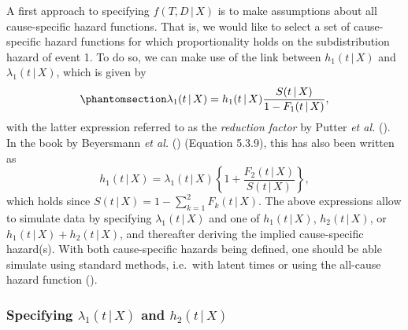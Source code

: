 \documentclass[
  letterpaper,
  DIV=11,
  numbers=noendperiod]{scrreprt}
\newcommand{\given}{\,|\,}
\begin{document}
A first approach to specifying \(f(T, D \given X)\) is to make
assumptions about all cause-specific hazard functions. That is, we would
like to select a set of cause-specific hazard functions for which
proportionality holds on the subdistribution hazard of event 1. To do
so, we can make use of the link between \(h_1(t \given X)\) and
\(\lambda_1(t \given X)\), which is given by
\begin{equation}\phantomsection\label{eq-reduc}{
\lambda_1(t \given X) = h_1(t \given X)\frac{S(t \given X)}{1 - F_1(t \given X)},
}\end{equation} with the latter expression referred to as the
\textit{reduction factor} by Putter \emph{et al.}
(). In the
book by Beyersmann \emph{et al.}
() (Equation
5.3.9), this has also been written as \begin{equation*}
    h_1(t \given X) = \lambda_1(t \given X)\left\{1 + \frac{F_2(t \given X)}{S(t \given X)}\right\},
\end{equation*} which holds since
\(S(t \given X) = 1 - \sum_{k=1}^2F_k(t \given X)\). The above
expressions allow to simulate data by specifying
\(\lambda_1(t \given X)\) and one of \(h_1(t \given X)\),
\(h_2(t \given X)\), or \(h_1(t \given X) + h_2(t \given X)\), and
thereafter deriving the implied cause-specific hazard(s). With both
cause-specific hazards being defined, one should be able simulate using
standard methods, i.e.~with latent times or using the all-cause hazard
function
().

\subsubsection{\texorpdfstring{Specifying \(\lambda_1(t \given X)\) and
\(h_2(t \given X)\)}{Specifying \textbackslash lambda\_1(t \textbackslash given X) and h\_2(t \textbackslash given X)}}\label{sec-reduct-int}
\end{document}
